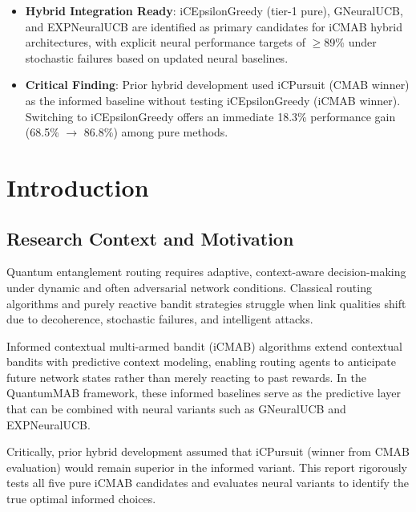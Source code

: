 \documentclass[12pt,a4paper]{article}
\newcommand{\primarytext}[1]{\textcolor{primaryblue}{\textbf{#1}}}
\newcommand{\warning}[1]{\textcolor{warningred}{\textbf{#1}}}
\begin{document}
\begin{tcolorbox}[colback=highlightgray,colframe=primaryblue,title=\textbf{Executive Summary}]
\begin{itemize}
\item \primarytext{Hybrid Integration Ready}: iCEpsilonGreedy (tier-1 pure), GNeuralUCB, and EXPNeuralUCB are identified as primary candidates for iCMAB hybrid architectures, with explicit neural performance targets of $\geq$89\% under stochastic failures based on updated neural baselines.
\item \warning{Critical Finding}: Prior hybrid development used iCPursuit (CMAB winner) as the informed baseline without testing iCEpsilonGreedy (iCMAB winner). Switching to iCEpsilonGreedy offers an immediate 18.3\% performance gain (68.5\% $\rightarrow$ 86.8\%) among pure methods.
\end{itemize}
\end{tcolorbox}

\newpage
\section{Introduction}

\subsection{Research Context and Motivation}
Quantum entanglement routing requires adaptive, context-aware decision-making under dynamic and often adversarial network conditions. Classical routing algorithms and purely reactive bandit strategies struggle when link qualities shift due to decoherence, stochastic failures, and intelligent attacks.

Informed contextual multi-armed bandit (iCMAB) algorithms extend contextual bandits with predictive context modeling, enabling routing agents to anticipate future network states rather than merely reacting to past rewards. In the QuantumMAB framework, these informed baselines serve as the predictive layer that can be combined with neural variants such as GNeuralUCB and EXPNeuralUCB.

Critically, prior hybrid development assumed that iCPursuit (winner from CMAB evaluation) would remain superior in the informed variant. This report rigorously tests all five pure iCMAB candidates and evaluates neural variants to identify the true optimal informed choices.
\end{document}
